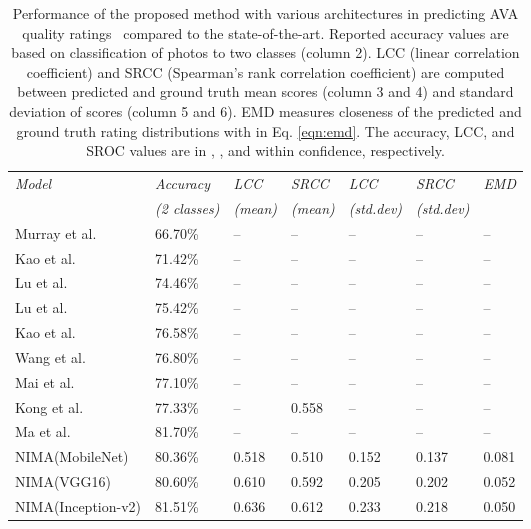 \documentclass[10pt,twocolumn,twoside]{IEEEtran}
\begin{document}
\begin{table*}[!t]
\vspace{12 mm}
\begin{center}
\captionsetup{width=0.57\textwidth}
\caption{Performance of the proposed method with various architectures in predicting AVA quality ratings~\cite{murray2012ava} compared to the state-of-the-art. Reported accuracy values are based on classification of photos to two classes (column 2). LCC (linear correlation coefficient) and SRCC (Spearman's rank correlation coefficient) are computed between predicted and ground truth mean scores (column 3 and 4) and standard deviation of scores (column 5 and 6). EMD measures closeness of the predicted and ground truth rating distributions with  in Eq. \ref{eqn:emd}. The accuracy, LCC, and SROC values are in ,  , and  within  confidence, respectively.}
\begin{tabular}{@{} *7l @{}}    \toprule
\emph{Model} & \emph{Accuracy} & \emph{LCC} & \emph{SRCC} & \emph{LCC} & \emph{SRCC} & \emph{EMD} \\
  & \emph{(2 classes)} & \emph{(mean)} & \emph{(mean)} & \emph{(std.dev)} & \emph{(std.dev)}\\\midrule
Murray et al.~\cite{murray2012ava}    & 66.70\% &  --  &  -- &  --  &  -- &  --   \\ 
Kao et al.~\cite{kao2015visual}    & 71.42\% &  --  &  --  &  --  &  --  &  --  \\ 
Lu et al. \cite{lu2014rapid}    & 74.46\%  & -- &  --  &  --  &  --  &  --  \\ 
Lu et al. \cite{lu2015rating}    & 75.42\%  & -- &  --  &  --  &  --  &  --  \\ 
Kao et al. \cite{kao2016visual}    & 76.58\% & -- &  --  &  --  &  -- &  --   \\ 
Wang et al. \cite{wang2016brain}    & 76.80\% & -- &  --  &  --  &  --  &  --  \\ 
Mai et al. \cite{mai2016composition}    & 77.10\%  & -- &  -- &  --  &  --  &  --  \\ 
Kong et al. \cite{kong2016photo}  &  77.33\% & --  & 0.558 &  --  &  --  &  --  \\
Ma et al. \cite{ma2017lamp} & 81.70\% & -- &  -- &  --  &  --  &  --  \\ \hdashline
NIMA(MobileNet)  & 80.36\%  & 0.518 & 0.510 &  0.152 &  0.137 &  0.081 \\
NIMA(VGG16)  & 80.60\%  & 0.610 & 0.592 &  0.205 &  0.202 &  0.052 \\
NIMA(Inception-v2)  & 81.51\%  & 0.636 & 0.612 &  0.233 &  0.218 &  0.050 \\\bottomrule
 \hline
\end{tabular}
\label{tab:ava_comp}
\end{center}
\end{table*}
\end{document}
